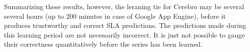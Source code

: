 Summarizing these results, however,
the leraning tie for Cerebro may be several
several hours (up to $200$ minutes in case of 
Google App Engine), before it produces trustworthy and correct 
SLA predictions.  The predictions made during this learning period are not
necessarily incorrect.  It is just not possible to gauge their correctness
quantitatively before the series has been learned. 
